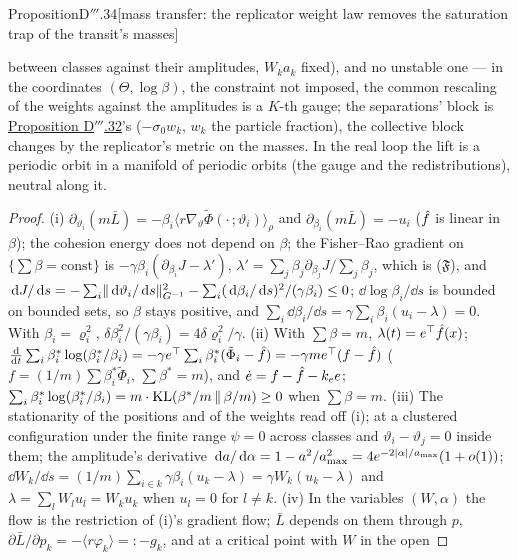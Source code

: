 \begin{thm}{Proposition}{D$'''$.34}[mass transfer: the replicator weight law removes the saturation trap of the
transit's masses]
\begin{enumerate}[label=\textup{(\roman*)}]
    between classes against their amplitudes, $W_ka_k$ fixed), and no unstable one --- in the coordinates
    $(\Theta,\log\beta)$, the constraint not imposed, the common rescaling of the weights against the amplitudes is a
    $K$-th gauge; the separations' block is \hyperref[res:thmDppp:32]{Proposition D$'''$.32}'s ($-\sigma_0w_k$,
    $w_k$ the particle fraction), the collective block changes by the replicator's metric on the masses. In the real
    loop the lift is a periodic orbit in a manifold of periodic orbits (the gauge and the redistributions), neutral
    along it.
\end{enumerate}
\end{thm}

\begin{proof}
(i) $\partial_{\vartheta_i}(m\bar L) = -\beta_i\langle r\nabla_\vartheta\tilde\Phi(\cdot\,;\vartheta_i)\rangle_\rho$
and $\partial_{\beta_i}(m\bar L) = -u_i$ ($\hat f$ is linear in $\beta$); the cohesion energy does not depend on
$\beta$; the Fisher--Rao gradient on $\{\sum\beta = \mathrm{const}\}$ is
$-\gamma\beta_i(\partial_{\beta_i}J - \lambda')$, $\lambda' = \sum_j\beta_j\partial_{\beta_j}J/\sum_j\beta_j$, which
is \textup{($\mathfrak{F}$)}, and
$\,\mathrm{d} J/\,\mathrm{d} s = -\sum_i\lVert \,\mathrm{d}\vartheta_i/\,\mathrm{d} s\rVert^2_{G^{-1}} - \sum_i(\,\mathrm{d}\beta_i/\,\mathrm{d} s)^2/(\gamma\beta_i)\le0$;
$\dd\log\beta_i/\dd s$ is bounded on bounded sets, so $\beta$ stays positive, and
$\sum_i\dd\beta_i/\dd s = \gamma\sum_i\beta_i(u_i - \lambda) = 0$. With $\beta_i = \varrho_i^2$,
$\delta\beta_i^2/(\gamma\beta_i) = 4\delta\varrho_i^2/\gamma$. (ii) With $\sum\beta = m$, $\lambda(t) = e^\top\hat f(x)$;
$\frac{\mathrm{d}}{\mathrm{d}t}\sum_i\beta^*_i\log(\beta^*_i/\beta_i)
= -\gamma e^\top\sum_i\beta^*_i(\tilde\Phi_i - \hat f) = -\gamma me^\top(f - \hat f)$
($f = (1/m)\sum\beta^*_i\tilde\Phi_i$, $\sum\beta^* = m$), and $\dot e = f - \hat f - k_ee$;
$\sum_i\beta^*_i\log(\beta^*_i/\beta_i) = m\cdot\operatorname{KL}(\beta^*/m\,\|\,\beta/m)\ge0$ when $\sum\beta = m$. (iii) The
stationarity of the positions and of the weights read off (i); at a clustered configuration under the finite range
$\psi = 0$ across classes and $\vartheta_i - \vartheta_j = 0$ inside them; the amplitude's derivative
$\,\mathrm{d} a/\,\mathrm{d}\alpha = 1 - a^2/a_{\max}^2 = 4e^{-2\lvert \alpha\rvert/a_{\max}}(1 + o(1))$;
$\dd W_k/\dd s = (1/m)\sum_{i\in k}\gamma\beta_i(u_k - \lambda) = \gamma W_k(u_k - \lambda)$ and
$\lambda = \sum_lW_lu_l = W_ku_k$ when $u_l = 0$ for $l\ne k$. (iv) In the variables $(W,\alpha)$ the flow is the
restriction of (i)'s gradient flow; $\bar L$ depends on them through $p$,
$\partial\bar L/\partial p_k = -\langle r\varphi_k\rangle =: -g_k$, and at a critical point with $W$ in the open

\end{proof}
